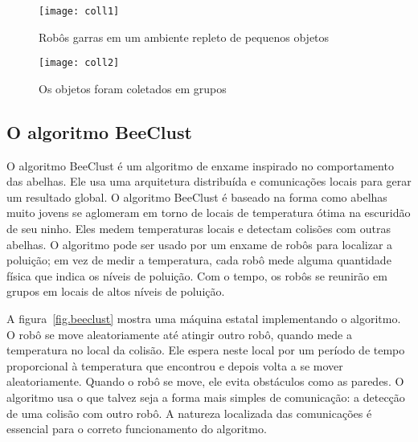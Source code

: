 \begin{figure}
\begin{minipage}{.45\textwidth}
\texttt{[image: coll1]}
\caption{Robôs garras em um ambiente repleto de pequenos objetos}
\label{fig.coll1}
\end{minipage}
\hspace{\fill}
\begin{minipage}{.45\textwidth}
\texttt{[image: coll2]}
\caption{Os objetos foram coletados em grupos}
\label{fig.coll2}
\end{minipage}
\end{figure}


\subsection{O algoritmo BeeClust}

O algoritmo BeeClust é um algoritmo de enxame inspirado no comportamento das abelhas. Ele usa uma arquitetura distribuída e comunicações locais para gerar um resultado global. O algoritmo BeeClust é baseado na forma como abelhas muito jovens se aglomeram em torno de locais de temperatura ótima na escuridão de seu ninho. Eles medem temperaturas locais e detectam colisões com outras abelhas.  O algoritmo pode ser usado por um enxame de robôs para localizar a poluição; em vez de medir a temperatura, cada robô mede alguma quantidade física que indica os níveis de poluição. Com o tempo, os robôs se reunirão em grupos em locais de altos níveis de poluição.

A figura~\ref{fig.beeclust} mostra uma máquina estatal implementando o algoritmo. O robô se move aleatoriamente até atingir outro robô, quando mede a temperatura no local da colisão. Ele espera neste local por um período de tempo proporcional à temperatura que encontrou e depois volta a se mover aleatoriamente. Quando o robô se move, ele evita obstáculos como as paredes. O algoritmo usa o que talvez seja a forma mais simples de comunicação: a detecção de uma colisão com outro robô. A natureza localizada das comunicações é essencial para o correto funcionamento do algoritmo.

